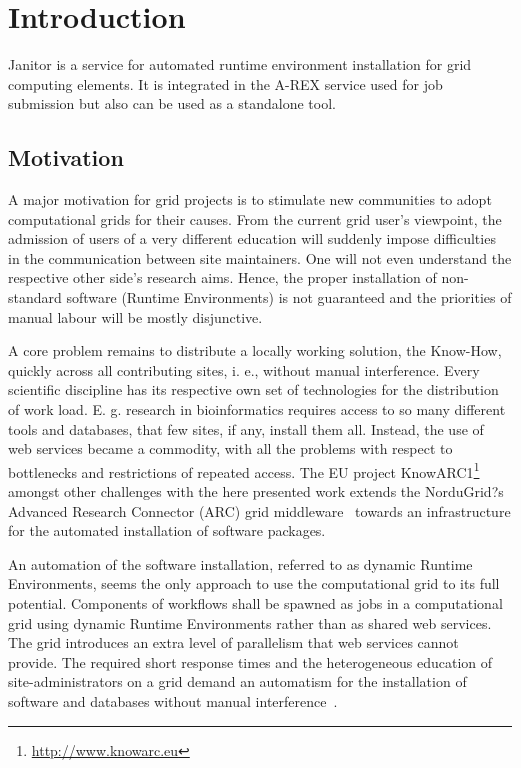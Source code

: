 \chapter{Introduction}

Janitor is a service for automated runtime environment installation for grid computing elements. It is integrated in the A-REX service used for job submission but also can be used as a standalone tool.

\section{Motivation}

A major motivation for grid projects is to stimulate new communities to adopt computational grids for their
causes. From the current grid user's viewpoint, the admission of users of a very different education will
suddenly impose difficulties in the communication between site maintainers. One will not even understand
the respective other side's research aims. Hence, the proper installation of non-standard software (Runtime
Environments) is not guaranteed and the priorities of manual labour will be mostly disjunctive.

A core problem remains to distribute a locally working solution, the Know-How, quickly across all contributing sites, i. e., without manual interference. Every scientific discipline has its respective own set of
technologies for the distribution of work load. E. g. research in bioinformatics requires access to so many
different tools and databases, that few sites, if any, install them all. Instead, the use of web services became
a commodity, with all the problems with respect to bottlenecks and restrictions of repeated access.
The EU project KnowARC1\footnote{\href{http://www.knowarc.eu}{http://www.knowarc.eu}} amongst other challenges with the here presented work extends the NorduGrid?s
Advanced Research Connector (ARC) grid middleware~\cite{ELLERT_2007} towards an infrastructure for the
automated installation of software packages.

An automation of the software installation, referred to as dynamic Runtime Environments, seems the only
approach to use the computational grid to its full potential. Components of workflows shall be spawned
as jobs in a computational grid using dynamic Runtime Environments rather than as shared web services.
The grid introduces an extra level of parallelism that web services cannot provide. The required short
response times and the heterogeneous education of site-administrators on a grid demand an automatism for
the installation of software and databases without manual interference~\cite{BAYER_2007}.

